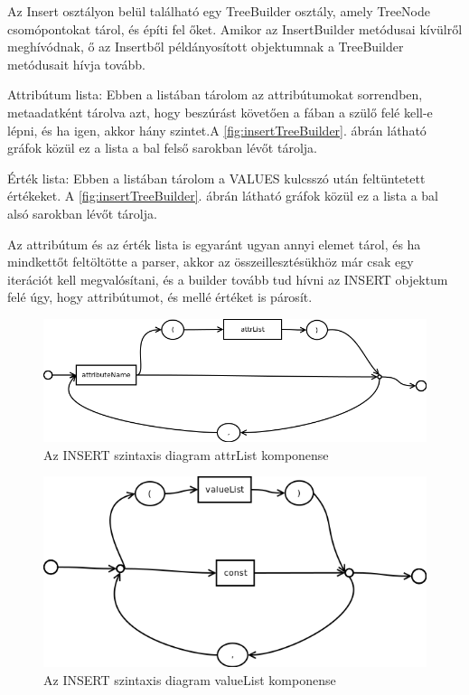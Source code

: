 Az Insert osztályon belül található egy TreeBuilder osztály, amely TreeNode csomópontokat tárol, és építi fel őket.
Amikor az InsertBuilder metódusai kívülről meghívódnak, ő az Insertből példányosított objektumnak a TreeBuilder metódusait hívja tovább.

Attribútum lista: Ebben a listában tárolom az attribútumokat sorrendben, metaadatként tárolva azt, hogy beszúrást követően a fában a szülő felé kell-e lépni, és ha igen, akkor hány szintet.A \ref{fig:insertTreeBuilder}. ábrán látható gráfok közül ez a lista a bal felső sarokban lévőt tárolja.

Érték lista: Ebben a listában tárolom a VALUES kulcsszó után feltüntetett értékeket. A \ref{fig:insertTreeBuilder}. ábrán látható gráfok közül ez a lista a bal alsó sarokban lévőt tárolja.

Az attribútum és az érték lista is egyaránt ugyan annyi elemet tárol, és ha mindkettőt feltöltötte a parser, akkor az összeillesztésükhöz már csak egy iterációt kell megvalósítani, és a builder tovább tud hívni az INSERT objektum felé úgy, hogy attribútumot, és mellé értéket is párosít.

\begin{figure}[htb]
	\begin{center}
		\includegraphics[scale=0.4]{images/attrList}
		\caption{Az INSERT szintaxis diagram attrList komponense}
		\label{fig:attrListSytnax}
	\end{center}
\end{figure}

\begin{figure}[htb]
	\begin{center}
		\includegraphics[scale=0.4]{images/valueList}
		\caption{Az INSERT szintaxis diagram valueList komponense}
		\label{fig:valueListSytnax}
	\end{center}
\end{figure}


